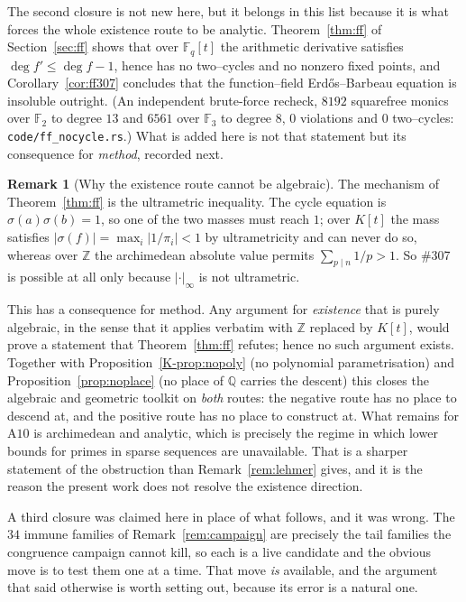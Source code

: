 \documentclass[11pt]{article}
\theoremstyle{definition}
\newtheorem{remark}[theorem]{Remark}
\begin{document}
The second closure is not new here, but it belongs in this list because it is what forces the whole
existence route to be analytic. Theorem~\ref{thm:ff} of Section~\ref{sec:ff} shows that over
$\mathbb{F}_q[t]$ the arithmetic derivative satisfies $\deg f'\le\deg f-1$, hence has no two--cycles
and no nonzero fixed points, and Corollary~\ref{cor:ff307} concludes that the function--field
Erd\H{o}s--Barbeau equation is insoluble outright. \textup{(An independent brute-force recheck,
$8192$ squarefree monics over $\mathbb{F}_2$ to degree $13$ and $6561$ over $\mathbb{F}_3$ to
degree $8$, $0$ violations and $0$ two--cycles: \texttt{code/ff\_nocycle.rs}.)} What is added here
is not that statement but its consequence for \emph{method}, recorded next.

\begin{remark}[Why the existence route cannot be algebraic]\label{rem:archimedean}
The mechanism of Theorem~\ref{thm:ff} is the ultrametric inequality. The cycle equation is
$\sigma(a)\sigma(b)=1$, so one of the two masses must reach $1$; over $K[t]$ the mass satisfies
$|\sigma(f)|=\max_i|1/\pi_i|<1$ by ultrametricity and can never do so, whereas over $\mathbb{Z}$ the
archimedean absolute value permits $\sum_{p\mid n}1/p>1$. So \#307 is possible at all only because
$|\cdot|_\infty$ is not ultrametric.

This has a consequence for method. Any argument for \emph{existence} that is purely algebraic, in
the sense that it applies verbatim with $\mathbb{Z}$ replaced by $K[t]$, would prove a statement
that Theorem~\ref{thm:ff} refutes; hence no such argument exists. Together with
Proposition~\ref{K-prop:nopoly} (no polynomial parametrisation) and Proposition~\ref{prop:noplace}
(no place of $\mathbb{Q}$ carries the descent) this closes the algebraic and geometric toolkit on
\emph{both} routes: the negative route has no place to descend at, and the positive route has no
place to construct at. What remains for $\mathrm{A}10$ is archimedean and analytic, which is
precisely the regime in which lower bounds for primes in sparse sequences are unavailable. That is
a sharper statement of the obstruction than Remark~\ref{rem:lehmer} gives, and it is the reason the
present work does not resolve the existence direction.
\end{remark}

A third closure was claimed here in place of what follows, and it was wrong. The $34$ immune
families of Remark~\textup{\ref{rem:campaign}} are precisely the tail families the congruence
campaign cannot kill, so each is a live candidate and the obvious move is to test them one at a
time. That move \emph{is} available, and the argument that said otherwise is worth setting out,
because its error is a natural one.
\end{document}
